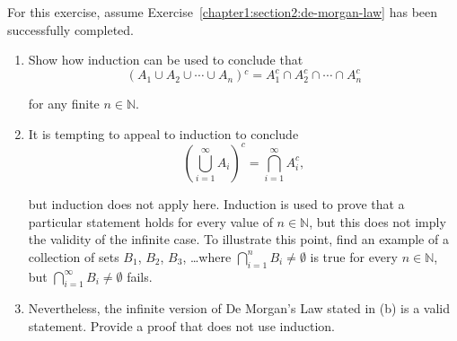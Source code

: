 \documentclass[class=understanding-analysis,crop=false]{standalone}
\begin{document}
\begin{exercise}
    \par For this exercise, assume Exercise~\ref{chapter1:section2:de-morgan-law} has been successfully completed.
    \begin{enumerate}[label = (\alph*)]
        \item Show how induction can be used to conclude that
              \[
                  (A_{1} \cup A_{2} \cup \cdots \cup A_{n}){}^{c} = A_{1}^{c} \cap A_{2}^{c} \cap \cdots \cap A_{n}^{c}
              \]
              \par for any finite $n \in \mathbb{N}$.
        \item It is tempting to appeal to induction to conclude
              \[
                  \left(\bigcup^{\infty}_{i=1}A_{i}\right)^{c} = \bigcap^{\infty}_{i=1}A_{i}^{c},
              \]
              \par but induction does not apply here. Induction is used to prove that a particular statement holds for every value of $n \in \mathbb{N}$, but this does not imply the validity of the infinite case. To illustrate this point, find an example of a collection of sets $B_{1}$, $B_{2}$, $B_{3}$, \ldots where $\bigcap^{n}_{i=1}B_{i} \ne \emptyset$ is true for every $n \in \mathbb{N}$, but $\bigcap^{\infty}_{i=1}B_{i} \ne \emptyset$ fails.
        \item Nevertheless, the infinite version of De Morgan's Law stated in (b) is a valid statement. Provide a proof that does not use induction.
    \end{enumerate}
\end{exercise}
\end{document}
